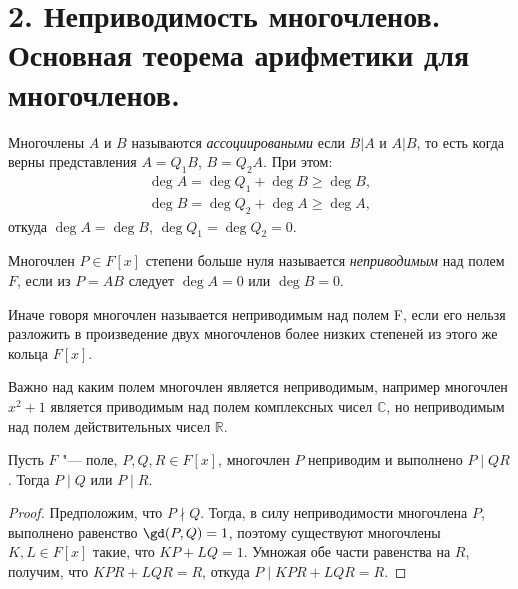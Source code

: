 \section{2. Неприводимость многочленов. Основная теорема арифметики для многочленов.}

\begin{definition}
    Многочлены $A$ и $B$ называются \textit{ассоциироваными} если $B \vert A$ и $A \vert B$, то есть когда верны 
    представления $A = Q_1 B$, $B = Q_2 A$. При этом:
    \begin{eqnarray*}
        \deg A = \deg Q_1 + \deg B \geq \deg B, \\
        \deg B = \deg Q_2 + \deg A \geq \deg A,
    \end{eqnarray*}
    откуда $\deg A = \deg B$, $\deg Q_1 = \deg Q_2 = 0$.
\end{definition}

\begin{definition}
    Многочлен $P \in F[x]$ степени больше нуля называется \textit{неприводимым} над полем $F$, если из $P = AB$ 
    следует $\deg A = 0$ или $\deg B = 0$.

    Иначе говоря многочлен называется неприводимым над полем F, если его нельзя разложить в 
    произведение двух многочленов более низких степеней из этого же кольца $F[x]$.
\end{definition}

\begin{note}
    Важно над каким полем многочлен является неприводимым, например многочлен $x^2 + 1$ является 
    приводимым над полем комплексных чисел $\mathbb{C}$, но неприводимым над полем действительных 
    чисел $\mathbb{R}$.
\end{note}

\begin{proposition}
    Пусть $F$ "--- поле, $P, Q, R \in F[x]$, многочлен $P$ неприводим и выполнено $P\mid QR$. Тогда $P\mid Q$ или $P\mid R$.
\end{proposition}

\begin{proof}
    Предположим, что $P\nmid Q$. Тогда, в силу неприводимости многочлена $P$, выполнено равенство $\gd(P, Q) = 1$, поэтому существуют многочлены $K, L \in F[x]$ такие, что $KP + LQ = 1$. Умножая обе части равенства на $R$, получим, что $KPR + LQR = R$, откуда $P \mid KPR + LQR = R$.
\end{proof}

